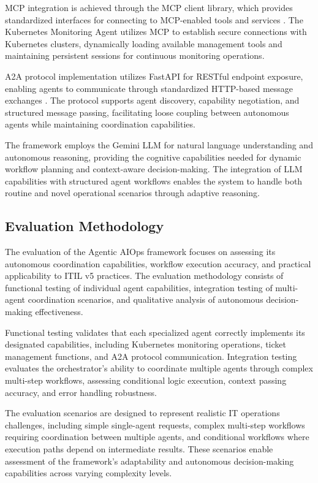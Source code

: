 \documentclass{article}
\begin{document}
MCP integration is achieved through the MCP client library, which provides standardized interfaces for connecting to MCP-enabled tools and services \cite{anthropic2024}. The Kubernetes Monitoring Agent utilizes MCP to establish secure connections with Kubernetes clusters, dynamically loading available management tools and maintaining persistent sessions for continuous monitoring operations.

A2A protocol implementation utilizes FastAPI for RESTful endpoint exposure, enabling agents to communicate through standardized HTTP-based message exchanges \cite{openai2024}. The protocol supports agent discovery, capability negotiation, and structured message passing, facilitating loose coupling between autonomous agents while maintaining coordination capabilities.

The framework employs the Gemini LLM for natural language understanding and autonomous reasoning, providing the cognitive capabilities needed for dynamic workflow planning and context-aware decision-making. The integration of LLM capabilities with structured agent workflows enables the system to handle both routine and novel operational scenarios through adaptive reasoning.

\subsection{Evaluation Methodology}

The evaluation of the Agentic AIOps framework focuses on assessing its autonomous coordination capabilities, workflow execution accuracy, and practical applicability to ITIL v5 practices. The evaluation methodology consists of functional testing of individual agent capabilities, integration testing of multi-agent coordination scenarios, and qualitative analysis of autonomous decision-making effectiveness.

Functional testing validates that each specialized agent correctly implements its designated capabilities, including Kubernetes monitoring operations, ticket management functions, and A2A protocol communication. Integration testing evaluates the orchestrator's ability to coordinate multiple agents through complex multi-step workflows, assessing conditional logic execution, context passing accuracy, and error handling robustness.

The evaluation scenarios are designed to represent realistic IT operations challenges, including simple single-agent requests, complex multi-step workflows requiring coordination between multiple agents, and conditional workflows where execution paths depend on intermediate results. These scenarios enable assessment of the framework's adaptability and autonomous decision-making capabilities across varying complexity levels.
\end{document}
